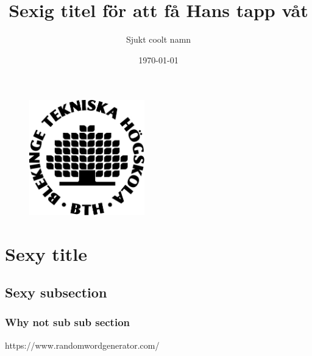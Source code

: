 \documentclass[a4paper]{article}
\title{Sexig titel för att få Hans tapp våt}
\author{Sjukt coolt namn}
\date{\today}
\begin{document}
\maketitle
\begin{figure}
\center
\includegraphics[width=5cm]{bth_logo.jpg}
\end{figure}
\pagebreak

\tableofcontents

\pagebreak

\section{Sexy title} %

\lipsum \cite{Ref1}%

\pagebreak

\subsection{Sexy subsection} %

\lipsum \cite{Ref1}%

\pagebreak

\subsubsection{Why not sub sub section} %

\lipsum \cite{Ref1}%

\begin{thebibliography}{9}

	https://www.randomwordgenerator.com/

\end{thebibliography}
\end{document}
